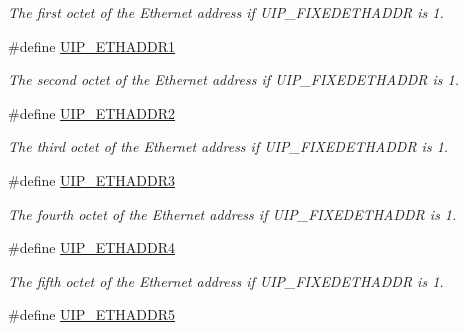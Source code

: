 \begin{CompactItemize}
\begin{CompactList}\small\item\em The first octet of the Ethernet address if UIP\_\-FIXEDETHADDR is 1. \item\end{CompactList}\item 
\hypertarget{a00071_gf3f291bfc1b7ecfc6029efe5f3a6f612}{
\#define \hyperlink{a00071_gf3f291bfc1b7ecfc6029efe5f3a6f612}{UIP\_\-ETHADDR1}}
\label{a00071_gf3f291bfc1b7ecfc6029efe5f3a6f612}

\begin{CompactList}\small\item\em The second octet of the Ethernet address if UIP\_\-FIXEDETHADDR is 1. \item\end{CompactList}\item 
\hypertarget{a00071_g061010ab6c76e03cc1bfb5ba6d4b8a73}{
\#define \hyperlink{a00071_g061010ab6c76e03cc1bfb5ba6d4b8a73}{UIP\_\-ETHADDR2}}
\label{a00071_g061010ab6c76e03cc1bfb5ba6d4b8a73}

\begin{CompactList}\small\item\em The third octet of the Ethernet address if UIP\_\-FIXEDETHADDR is 1. \item\end{CompactList}\item 
\hypertarget{a00071_g0a44b1ff94c0adf3d6e46d139ce07476}{
\#define \hyperlink{a00071_g0a44b1ff94c0adf3d6e46d139ce07476}{UIP\_\-ETHADDR3}}
\label{a00071_g0a44b1ff94c0adf3d6e46d139ce07476}

\begin{CompactList}\small\item\em The fourth octet of the Ethernet address if UIP\_\-FIXEDETHADDR is 1. \item\end{CompactList}\item 
\hypertarget{a00071_gb79c04002ae9a43d2801594e11273ea3}{
\#define \hyperlink{a00071_gb79c04002ae9a43d2801594e11273ea3}{UIP\_\-ETHADDR4}}
\label{a00071_gb79c04002ae9a43d2801594e11273ea3}

\begin{CompactList}\small\item\em The fifth octet of the Ethernet address if UIP\_\-FIXEDETHADDR is 1. \item\end{CompactList}\item 
\hypertarget{a00071_g96cd1f904e357ab0510dd6a2b27ea8c8}{
\#define \hyperlink{a00071_g96cd1f904e357ab0510dd6a2b27ea8c8}{UIP\_\-ETHADDR5}}
\label{a00071_g96cd1f904e357ab0510dd6a2b27ea8c8}


\end{CompactItemize}
